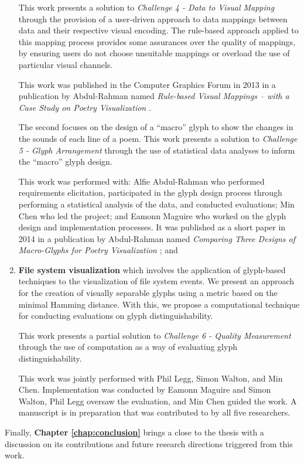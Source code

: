 \begin{enumerate}
This work presents a solution to \emph{Challenge 4 - Data to Visual Mapping} through the provision of a user-driven approach to data mappings between data and their respective visual encoding.
The rule-based approach applied to this mapping process provides some assurances over the quality of mappings, by ensuring users do not choose unsuitable mappings or overload the use of particular visual channels.

This work was published in the Computer Graphics Forum in 2013 in a publication by Abdul-Rahman \etal named \emph{Rule-based Visual Mappings -- with a Case Study on Poetry Visualization} \cite{CGF:Abd2013a}.
 
The second focuses on the design of a ``macro'' glyph to show the changes in the sounds of each line of a poem.
This work presents a solution to \emph{Challenge 5 - Glyph Arrangement} through the use of statistical data analyses to inform the ``macro'' glyph design.

This work was performed with: Alfie Abdul-Rahman who performed requirements elicitation, participated in the glyph design process through performing a statistical analysis of the data, and conducted evaluations; Min Chen who led the project; and Eamonn Maguire who worked on the glyph design and implementation processes.
It was published as a short paper in 2014 in a publication by Abdul-Rahman \etal named \emph{Comparing Three Designs of Macro-Glyphs for Poetry Visualization} \cite{CGF:abdul-rahman14-sp}; and

\item \textbf{File system visualization} which involves the application of glyph-based techniques to the visualization of file system events. 
We present an approach for the creation of visually separable glyphs using a metric based on the minimal Hamming distance.
With this, we propose a computational technique for conducting evaluations on glyph distinguishability.

This work presents a partial solution to \emph{Challenge 6 - Quality Measurement} through the use of computation as a way of evaluating glyph distinguishability.

This work was jointly performed with Phil Legg, Simon Walton, and Min Chen.
Implementation was conducted by Eamonn Maguire and Simon Walton, Phil Legg oversaw the evaluation, and Min Chen guided the work.
A manuscript is in preparation that was contributed to by all five researchers.
\end{enumerate}

Finally, \textbf{Chapter \ref{chap:conclusion}} brings a close to the thesis with a discussion on its contributions and future research directions triggered from this work.
